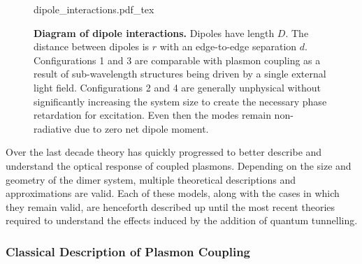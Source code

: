 \documentclass{article}
\begin{document}
\begin{figure}[bt]
\fontsize{10pt}{1em}\selectfont
\def\svgwidth{0.7\textwidth}
{dipole_interactions.pdf_tex}
\caption[Diagram of dipole interactions]{\textbf{Diagram of dipole interactions.} Dipoles have length $D$. The distance between dipoles is $r$ with an edge-to-edge separation $d$. Configurations 1 and 3 are comparable with plasmon coupling as a result of sub-wavelength structures being driven by a single external light field. {\color{red}Configurations 2 and 4 are generally unphysical without significantly increasing the system size to create the necessary phase retardation for excitation. Even then the modes remain non-radiative due to zero net dipole moment.}}
\label{fig:dipole_interactions}
\end{figure}

Over the last decade theory has quickly progressed to better describe and understand the optical response of coupled plasmons. Depending on the size and geometry of the dimer system, multiple theoretical descriptions and approximations are valid. Each of these models, along with the cases in which they remain valid, are henceforth described up until the most recent theories required to understand the effects induced by the addition of quantum tunnelling.

\subsubsection{Classical Description of Plasmon Coupling}
\end{document}
